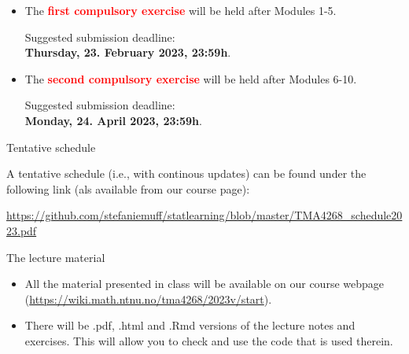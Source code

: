 \documentclass[
  10pt,
  ignorenonframetext,
]{beamer}
\providecommand{\tightlist}{%
  \setlength{\itemsep}{0pt}\setlength{\parskip}{0pt}}
\begin{document}
\begin{frame}
\begin{itemize}
\item
  The \textbf{\textcolor{red}{first compulsory exercise}} will be held
  after Modules 1-5.

  \hspace{8mm}

  Suggested submission deadline:\\
  \vspace{2mm} \hspace{8mm} \textbf{Thursday, 23. February 2023,
  23:59h}.
\end{itemize}

\vspace{8mm}

\begin{itemize}
\item
  The \textbf{\textcolor{red}{second compulsory exercise}} will be held
  after Modules 6-10.

  \hspace{8mm}

  Suggested submission deadline:\\
  \vspace{2mm} \hspace{8mm}\textbf{Monday, 24. April 2023, 23:59h}.
\end{itemize}
\end{frame}

\begin{frame}
\begin{block}{Tentative schedule}
\protect\hypertarget{tentative-schedule}{}
\(~\)

A tentative schedule (i.e., with continous updates) can be found under
the following link (als available from our course page):

\vspace{2mm}

\url{https://github.com/stefaniemuff/statlearning/blob/master/TMA4268_schedule2023.pdf}
\end{block}
\end{frame}

\begin{frame}
\begin{block}{The lecture material}
\protect\hypertarget{the-lecture-material}{}
\(~\)

\begin{itemize}
\tightlist
\item
  All the material presented in class will be available on our course
  webpage (\url{https://wiki.math.ntnu.no/tma4268/2023v/start}).
\end{itemize}

\vspace{2mm}

\begin{itemize}
\tightlist
\item
  There will be .pdf, .html and .Rmd versions of the lecture notes and
  exercises. This will allow you to check and use the code that is used
  therein.
\end{itemize}
\end{block}
\end{frame}
\end{document}
